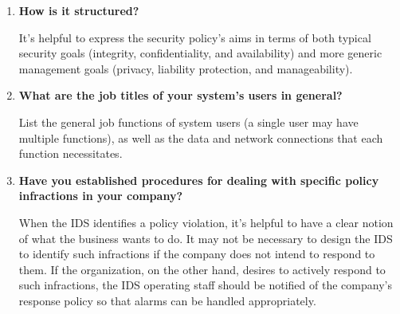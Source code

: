 \documentclass[12pt]{article}
\begin{document}
    \begin{enumerate}
        \item \textbf{How is it structured?}
        \par It's helpful to express the security policy's aims in terms of both typical security goals (integrity, confidentiality, and availability) and more generic management goals (privacy, liability protection, and manageability).
        
        \item \textbf{What are the job titles of your system's users in general?}
        \par List the general job functions of system users (a single user may have multiple functions), as well as the data and network connections that each function necessitates.
        
        \item \textbf{Have you established procedures for dealing with specific policy infractions in your company?}
        \par When the IDS identifies a policy violation, it's helpful to have a clear notion of what the business wants to do. It may not be necessary to design the IDS to identify such infractions if the company does not intend to respond to them. If the organization, on the other hand, desires to actively respond to such infractions, the IDS operating staff should be notified of the company's response policy so that alarms can be handled appropriately.
    \end{enumerate}
    
\end{document}
